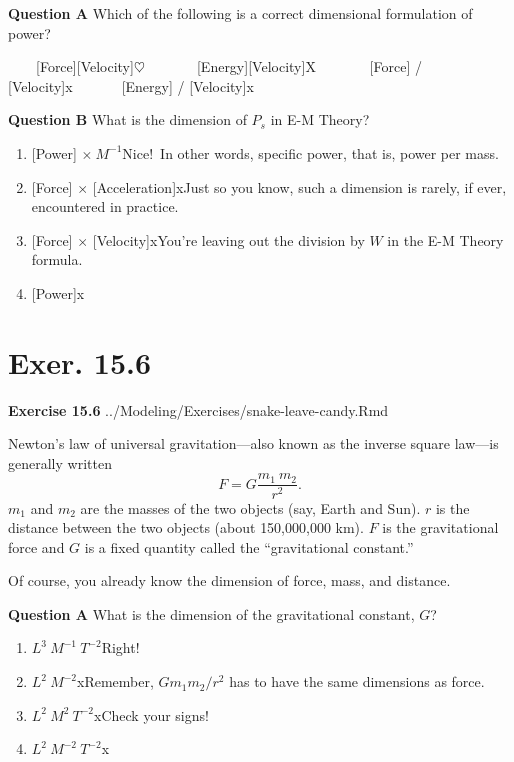 \documentclass[
  letterpaper,
  DIV=11,
  numbers=noendperiod,
  oneside]{article}
\providecommand{\tightlist}{%
  \setlength{\itemsep}{0pt}\setlength{\parskip}{0pt}}\usepackage{longtable,booktabs,array}
\begin{document}
\begin{multicols}{2}
\textbf{Question A} Which of the following is a correct dimensional
formulation of power?

~~~~{{[}Force{]}{[}Velocity{]}{\(\heartsuit\ \)}}~~~~~~~{{[}Energy{]}{[}Velocity{]}{︎X
}}~~~~~~~{{[}Force{]} / {[}Velocity{]}{x}}~~~~~~~{{[}Energy{]} /
{[}Velocity{]}{x}}

\textbf{Question B} What is the dimension of \(P_s\) in E-M Theory?

\begin{enumerate}
\def\labelenumi{\roman{enumi}.}
\tightlist
\item
  {{[}Power{]} \(\times\ M^{-1}\){Nice!~In other words, specific power,
  that is, power per mass.}}\\
\item
  {{[}Force{]} \(\times\) {[}Acceleration{]}{xJust so you know, such a
  dimension is rarely, if ever, encountered in practice.}}\\
\item
  {{[}Force{]} \(\times\) {[}Velocity{]}{xYou're leaving out the
  division by \(W\) in the E-M Theory formula.}}\\
\item
  {{[}Power{]}{x}}
\end{enumerate}

\hypertarget{exer.-15.6}{%
\section*{Exer. 15.6}\label{exer.-15.6}}

\textbf{Exercise 15.6} ../Modeling/Exercises/snake-leave-candy.Rmd

Newton's law of universal gravitation---also known as the inverse square
law---is generally written \[F = G \frac{m_1\ m_2}{r^2} .\] \(m_1\) and
\(m_2\) are the masses of the two objects (say, Earth and Sun). \(r\) is
the distance between the two objects (about 150,000,000 km). \(F\) is
the gravitational force and \(G\) is a fixed quantity called the
``gravitational constant.''

Of course, you already know the dimension of force, mass, and distance.

\textbf{Question A} What is the dimension of the gravitational constant,
\(G\)?

\begin{enumerate}
\def\labelenumi{\roman{enumi}.}
\tightlist
\item
  {\(L^3\ M^{-1}\ T^{-2}\){Right!~}}\\
\item
  {\(L^2\ M^{-2}\){xRemember, \(G m_1 m_2 / r^2\) has to have the same
  dimensions as force.}}\\
\item
  {\(L^2\ M^{2}\ T^{-2}\){xCheck your signs!}}\\
\item
  {\(L^2\ M^{-2}\ T^{-2}\){x}}
\end{enumerate}


\end{multicols}
\end{document}
